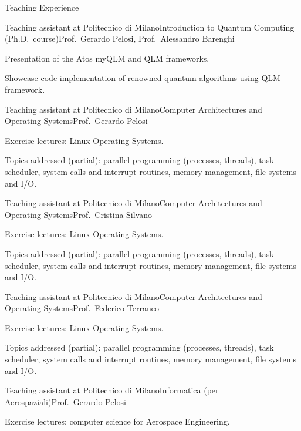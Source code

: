 \documentclass[
	a4paper, %
	10pt, %
]{tresume} %
\begin{document}
\begin{tSection}{Teaching Experience}
  \begin{tSubsection}{Teaching assistant at Politecnico di Milano}{}{Introduction
    to Quantum Computing (Ph.D.\ course)}{Prof.\ Gerardo Pelosi, Prof.\ Alessandro Barenghi}
  \item Presentation of the Atos myQLM and QLM frameworks.
  \item Showcase code implementation of renowned quantum algorithms using QLM
    framework.
  \end{tSubsection}
  \begin{tSubsection}{Teaching assistant at Politecnico di Milano}{}{Computer Architectures and Operating Systems}{Prof.\ Gerardo Pelosi}
  \item Exercise lectures: Linux Operating Systems.
  \item Topics addressed (partial): parallel programming (processes, threads),
    task scheduler, system calls and interrupt routines, memory management, file
    systems and I/O.
  \end{tSubsection}
  \begin{tSubsection}{Teaching assistant at Politecnico di Milano}{}{Computer Architectures and
      Operating Systems}{Prof.\ Cristina Silvano }
  \item Exercise lectures: Linux Operating Systems.
  \item Topics addressed (partial): parallel programming (processes, threads),
    task scheduler, system calls and interrupt routines, memory management, file
    systems and I/O.
  \end{tSubsection}
  \begin{tSubsection}{Teaching assistant at Politecnico di Milano}{}{Computer Architectures and
      Operating Systems}{Prof.\ Federico Terraneo}
  \item Exercise lectures: Linux Operating Systems.
  \item Topics addressed (partial): parallel programming (processes, threads),
    task scheduler, system calls and interrupt routines, memory management, file
    systems and I/O.
  \end{tSubsection}
  \begin{tSubsection}{Teaching assistant at Politecnico di Milano}{}{Informatica (per Aerospaziali)}{Prof.\ Gerardo Pelosi}
  \item Exercise lectures: computer science for Aerospace Engineering.

\end{tSubsection}
\end{tSection}
\end{document}
